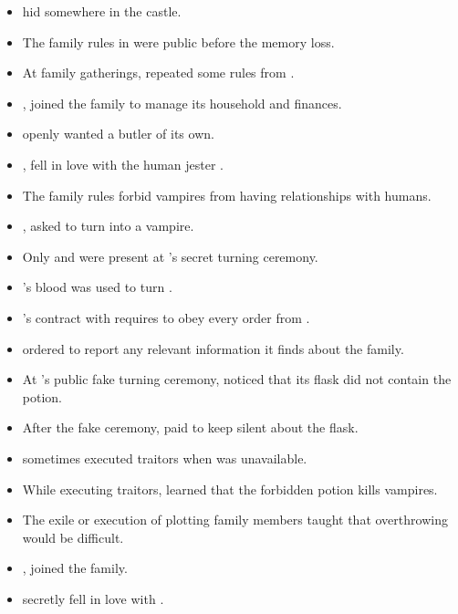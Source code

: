 \begin{itemize}
  \item {} hid  somewhere in the castle.
  \item The family rules in  were public before the memory loss.
  \item At family gatherings,  repeated some rules from .
  \item {},  joined the family to manage its household and finances.
  \item {} openly wanted a butler of its own.
  \item {},  fell in love with the human jester .
  \item The family rules forbid vampires from having relationships with humans.
  \item {},  asked  to turn  into a vampire.
  \item Only  and  were present at 's secret turning ceremony.
  \item {}'s blood was used to turn .
  \item {}'s contract with  requires  to obey every order from .
  \item {} ordered  to report any relevant information it finds about the family.
  \item At 's public fake turning ceremony,  noticed that its flask did not contain the potion.
  \item After the fake ceremony,  paid  to keep silent about the flask.
  \item {} sometimes executed traitors when  was unavailable.
  \item While executing traitors,  learned that the forbidden potion kills vampires.
  \item The exile or execution of plotting family members taught  that overthrowing  would be difficult.
  \item {},  joined the family.
  \item {} secretly fell in love with .

\end{itemize}
